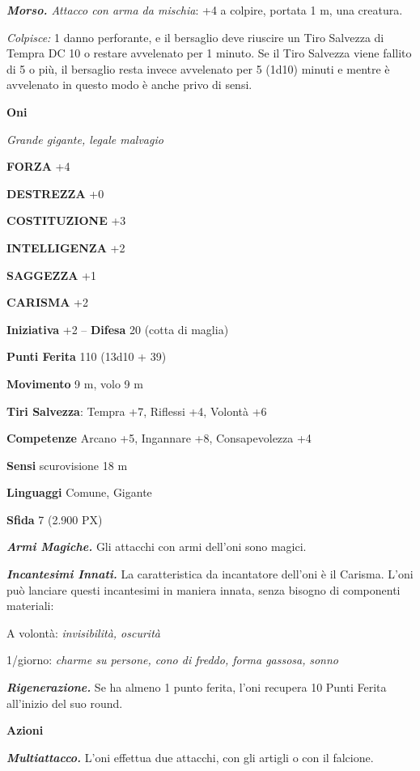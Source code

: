 \begin{multicols}{2}
	\textit{\textbf{Morso.} Attacco con arma da mischia}: +4 a colpire, portata 1 m, una creatura.

	\textit{Colpisce:} 1 danno perforante, e il bersaglio deve riuscire un Tiro Salvezza di Tempra DC 10 o restare avvelenato per 1 minuto. Se il Tiro Salvezza viene fallito di 5 o più, il bersaglio resta invece avvelenato per 5 (1d10) minuti e mentre è avvelenato in questo modo è anche privo di sensi.

	\medskip{}\textbf{Oni}

	\textit{Grande gigante, legale malvagio}

	\textbf{FORZA} +4

	\textbf{DESTREZZA} +0

	\textbf{COSTITUZIONE} +3

	\textbf{INTELLIGENZA} +2

	\textbf{SAGGEZZA} +1

	\textbf{CARISMA} +2

	\textbf{Iniziativa} +2 -- \textbf{Difesa} 20 (cotta di maglia)

	\textbf{Punti Ferita} 110 (13d10 + 39)

	\textbf{Movimento} 9 m, volo 9 m

	\textbf{Tiri Salvezza}: Tempra +7, Riflessi +4, Volontà +6

	\textbf{Competenze} Arcano +5, Ingannare +8, Consapevolezza +4

	\textbf{Sensi} scurovisione 18 m

	\textbf{Linguaggi} Comune, Gigante

	\textbf{Sfida} 7 (2.900 PX)

	\textit{\textbf{Armi Magiche.}} Gli attacchi con armi dell'oni sono magici.

	\textit{\textbf{Incantesimi Innati.}} La caratteristica da incantatore dell'oni è il Carisma. L'oni può lanciare questi incantesimi in maniera innata, senza bisogno di componenti materiali:

	A volontà: \textit{invisibilità, oscurità}

	1/giorno: \textit{charme su persone, cono di freddo, forma gassosa,}
	\textit{sonno}

	\textit{\textbf{Rigenerazione.}} Se ha almeno 1 punto ferita, l'oni recupera 10 Punti Ferita all'inizio del suo round.

	\textbf{Azioni}

	\textit{\textbf{Multiattacco.}} L'oni effettua due attacchi, con gli artigli o con il falcione.


\end{multicols}

